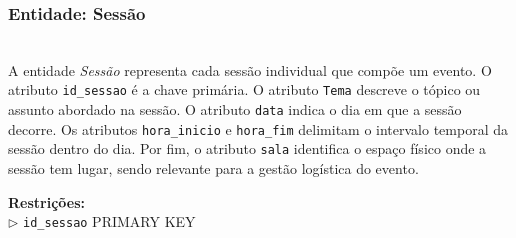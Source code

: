 \documentclass[runningheads]{llncs}
\begin{document}
                    \noindent\begin{minipage}{\textwidth}
                    \subsubsection{Entidade: Sessão}\mbox{}\\

                    A entidade \textit{Sessão} representa cada sessão individual que compõe um evento. 
                    O atributo \texttt{id\_sessao} é a chave primária. O atributo \texttt{Tema} descreve o 
                    tópico ou assunto abordado na sessão. O atributo \texttt{data} indica o dia em que a 
                    sessão decorre. Os atributos \texttt{hora\_inicio} e \texttt{hora\_fim} delimitam o 
                    intervalo temporal da sessão dentro do dia. Por fim, o atributo \texttt{sala} identifica 
                    o espaço físico onde a sessão tem lugar, sendo relevante para a gestão logística do evento.

                    \begin{table}[H]
                    \centering
                    \renewcommand{\arraystretch}{1.5}
                    \vspace{0.2cm}
                    \caption{Atributos da entidade Sessão}
                    \label{tab:sessao}
                    \end{table}
                    \vspace{0.1cm}
                    \noindent\textbf{Restrições:}\\
                    \indent $\triangleright$ \texttt{id\_sessao} PRIMARY KEY
                    \end{minipage}
                    \vspace{0.4cm}
\end{document}
